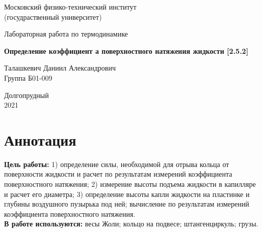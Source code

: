 \documentclass[a4paper,11.5pt]{article} %
\begin{document}


\begin{titlepage}

	\newpage
	\begin{center}
		\normalsize Московский физико-технический институт \\(госудраственный 			университет)
	\end{center}

	\vspace{6em}

	\begin{center}
		\Large Лабораторная работа по термодинамике\\
	\end{center}

	\vspace{1em}

	\begin{center}
		\large \textbf{Определение коэффициент а поверхностного натяжения жидкости [2.5.2]}
	\end{center}

	\vspace{2em}

	\begin{center}
		\large Талашкевич Даниил Александрович\\
		Группа Б01-009
	\end{center}

	\vspace{\fill}

	\begin{center}
	Долгопрудный \\2021
	\end{center}
	
\end{titlepage}



	\thispagestyle{empty}
	\newpage
	\tableofcontents
	\newpage
	\setcounter{page}{1}




\section{Аннотация}
\textbf{Цель работы:} 1) определение силы, необходимой для отрыва кольца от поверхности жидкости и расчет по результатам измерений коэффициента поверхностного натяжения; 2) измерение высоты подъема жидкости в капилляре и расчет его диаметра; 3) определение высоты капли жидкости на пластинке и глубины воздушного пузырька под ней; вычисление по результатам измерений
коэффициента поверхностного натяжения.\\
\textbf{В работе используются:} весы Жоли; кольцо на подвесе; штангенциркуль; грузы.
\end{document}
